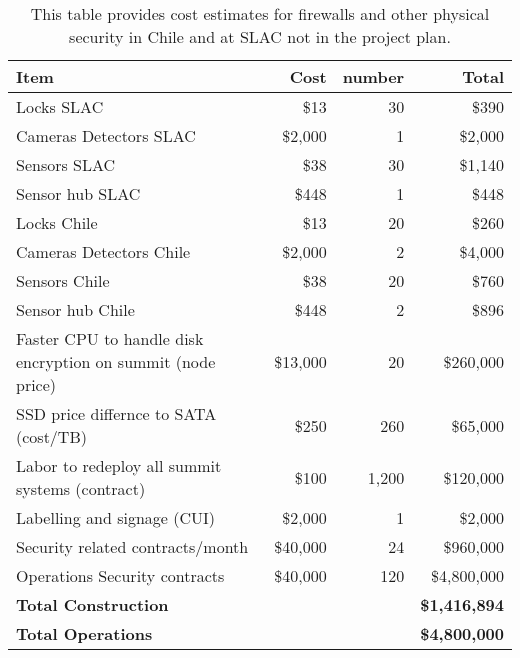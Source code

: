 \tiny \begin{longtable} {|p{}|r|r|r|} \caption{This table provides cost estimates for firewalls and other physical security in Chile and at SLAC not in the project plan. \label{tab:firewalls}}\\ 
\hline 
\textbf{Item}&\textbf{Cost}&\textbf{number}&\textbf{Total} \\ \hline
{Locks SLAC}&{\$13}&{30}&{\$390} \\ \hline
{Cameras Detectors  SLAC}&{\$2,000}&{1}&{\$2,000} \\ \hline
{Sensors SLAC}&{\$38}&{30}&{\$1,140} \\ \hline
{Sensor hub SLAC}&{\$448}&{1}&{\$448} \\ \hline
{Locks Chile}&{\$13}&{20}&{\$260} \\ \hline
{Cameras Detectors Chile}&{\$2,000}&{2}&{\$4,000} \\ \hline
{Sensors Chile}&{\$38}&{20}&{\$760} \\ \hline
{Sensor hub Chile}&{\$448}&{2}&{\$896} \\ \hline
{Faster CPU to handle disk encryption on summit (node price)}&{\$13,000}&{20}&{\$260,000} \\ \hline
{SSD price differnce to SATA (cost/TB)}&{\$250}&{260}&{\$65,000} \\ \hline
{Labor to redeploy all summit systems (contract)}&{\$100}&{1,200}&{\$120,000} \\ \hline
{Labelling and signage (CUI)}&{\$2,000}&{1}&{\$2,000} \\ \hline
{Security related contracts/month}&{\$40,000}&{24}&{\$960,000} \\ \hline
{Operations Security contracts}&{\$40,000}&{120}&{\$4,800,000} \\ \hline
\textbf{Total Construction}&\textbf{}&\textbf{}&\textbf{\$1,416,894} \\ \hline
\textbf{Total Operations}&\textbf{}&\textbf{}&\textbf{\$4,800,000} \\ \hline
\end{longtable} \normalsize
